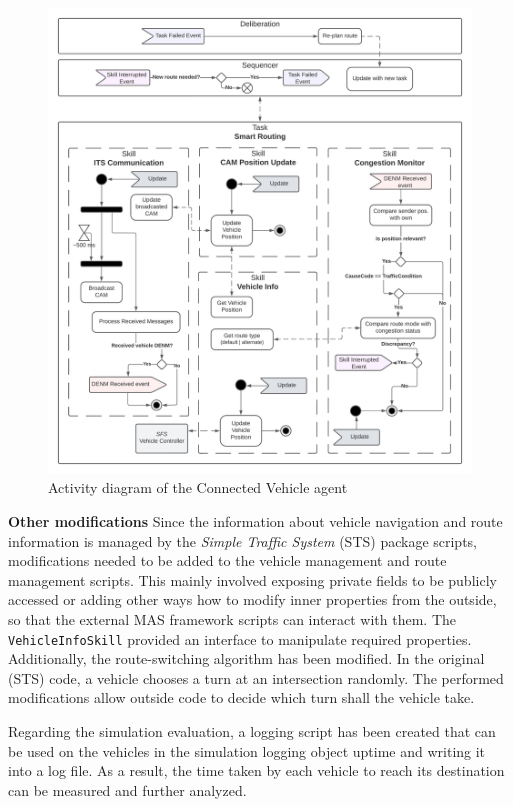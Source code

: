 \documentclass[main.tex]{subfiles}
\begin{document}
\begin{figure}[htbp]
    \centering
    \includegraphics[width=.99\textwidth]{SmartRoutingVehicle.png}
    \caption{Activity diagram of the Connected Vehicle agent}
    \label{ad-smartRoutingVehicle}
\end{figure}

\textbf{Other modifications} \smallskip \newline
Since the information about vehicle navigation and route information is managed by the
\emph{Simple Traffic System} (STS) package scripts, modifications needed to be added to the
vehicle management and route management scripts. This mainly involved exposing private fields
to be publicly accessed or adding other ways how to modify inner properties from the outside,
so that the external MAS framework scripts can interact with them. The
\texttt{VehicleInfoSkill} provided an interface to manipulate required properties.
Additionally, the route-switching algorithm has been modified. In the original (STS) code,
a vehicle chooses a turn at an intersection randomly. The performed modifications allow outside 
code to decide which turn shall the vehicle take.

Regarding the simulation evaluation, a logging script has been created that can be used on the 
vehicles in the simulation logging object uptime and writing it into a log file. As a result, 
the time taken by each vehicle to reach its destination can be measured and further analyzed.
\end{document}
